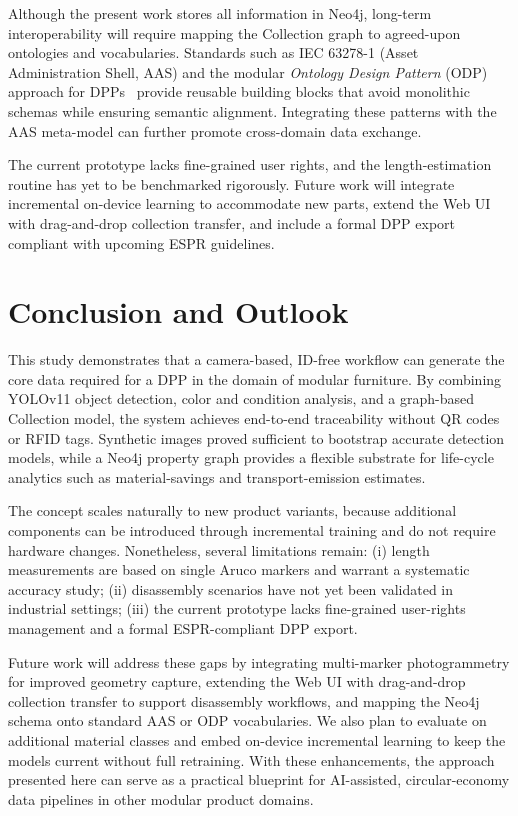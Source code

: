 \documentclass[3p,times,procedia]{elsarticle}
\begin{document}
Although the present work stores all information in Neo4j, long-term interoperability will require mapping the Collection graph to agreed-upon ontologies and vocabularies.  Standards such as IEC 63278-1 (Asset Administration Shell, AAS) and the modular \emph{Ontology Design Pattern} (ODP) approach for DPPs~\cite{Pourjafarian2025} provide reusable building blocks that avoid monolithic schemas while ensuring semantic alignment.  Integrating these patterns with the AAS meta-model can further promote cross-domain data exchange.

The current prototype lacks fine-grained user rights, and the length-estimation routine has yet to be benchmarked rigorously.  Future work will integrate incremental on-device learning to accommodate new parts, extend the Web UI with drag-and-drop collection transfer, and include a formal DPP export compliant with upcoming ESPR guidelines.

\section{Conclusion and Outlook}
\label{sec:conclusion}

This study demonstrates that a camera-based, ID-free workflow can generate the core data required for a DPP in the domain of modular furniture.  By combining YOLOv11 object detection, color and condition analysis, and a graph-based Collection model, the system achieves end-to-end traceability without QR codes or RFID tags.  Synthetic images proved sufficient to bootstrap accurate detection models, while a Neo4j property graph provides a flexible substrate for life-cycle analytics such as material-savings and transport-emission estimates.

The concept scales naturally to new product variants, because additional components can be introduced through incremental training and do not require hardware changes.  Nonetheless, several limitations remain: (i) length measurements are based on single Aruco markers and warrant a systematic accuracy study; (ii) disassembly scenarios have not yet been validated in industrial settings; (iii) the current prototype lacks fine-grained user-rights management and a formal ESPR-compliant DPP export.

Future work will address these gaps by integrating multi-marker photogrammetry for improved geometry capture, extending the Web UI with drag-and-drop collection transfer to support disassembly workflows, and mapping the Neo4j schema onto standard AAS or ODP vocabularies.  We also plan to evaluate on additional material classes and embed on-device incremental learning to keep the models current without full retraining.  With these enhancements, the approach presented here can serve as a practical blueprint for AI-assisted, circular-economy data pipelines in other modular product domains.



\end{document}
